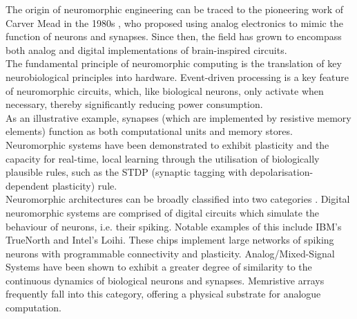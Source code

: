 \noindent The origin of neuromorphic engineering can be traced to the pioneering work of Carver Mead in the 1980s \cite{mead1989analog}, who proposed using analog electronics to mimic the function of neurons and synapses. Since then, the field has grown to encompass both analog and digital implementations of brain-inspired circuits.\\

\noindent The fundamental principle of neuromorphic computing is the translation of key neurobiological principles into hardware. Event-driven processing is a key feature of neuromorphic circuits, which, like biological neurons, only activate when necessary, thereby significantly reducing power consumption. \\

\noindent As an illustrative example, synapses (which are implemented by resistive memory elements) function as both computational units and memory stores. Neuromorphic systems have been demonstrated to exhibit plasticity and the capacity for real-time, local learning through the utilisation of biologically plausible rules, such as the STDP (synaptic tagging with depolarisation-dependent plasticity) rule. \\

\noindent Neuromorphic architectures can be broadly classified into two categories \cite{ceolini2020hand}. Digital neuromorphic systems are comprised of digital circuits which simulate the behaviour of neurons, i.e. their spiking. Notable examples of this include IBM's TrueNorth and Intel's Loihi. These chips implement large networks of spiking neurons with programmable connectivity and plasticity. Analog/Mixed-Signal Systems have been shown to exhibit a greater degree of similarity to the continuous dynamics of biological neurons and synapses. Memristive arrays frequently fall into this category, offering a physical substrate for analogue computation.\\

